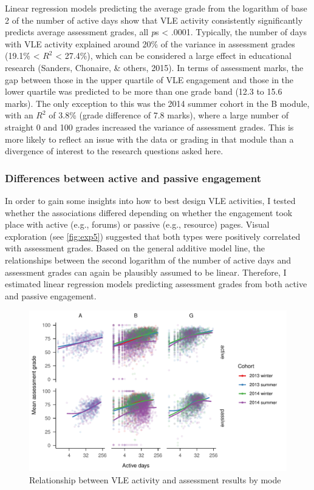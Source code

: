 \documentclass[
  english,
  man,mask,floatsintext]{apa6}
\begin{document}
Linear regression models predicting the average grade from the logarithm of base 2 of the number of active days show that VLE activity consistently significantly predicts average assessment grades, all \emph{p}s \textless{} .0001. Typically, the number of days with VLE activity explained around 20\% of the variance in assessment grades (19.1\% \textless{} \(R^2\) \textless{} 27.4\%), which can be considered a large effect in educational research (Sanders, Chonaire, \& others, 2015). In terms of assessment marks, the gap between those in the upper quartile of VLE engagement and those in the lower quartile was predicted to be more than one grade band (12.3 to 15.6 marks). The only exception to this was the 2014 summer cohort in the B module, with an \(R^2\) of 3.8\% (grade difference of 7.8 marks), where a large number of straight 0 and 100 grades increased the variance of assessment grades. This is more likely to reflect an issue with the data or grading in that module than a divergence of interest to the research questions asked here.

\hypertarget{differences-between-active-and-passive-engagement}{%
\subsubsection{Differences between active and passive engagement}\label{differences-between-active-and-passive-engagement}}

In order to gain some insights into how to best design VLE activities, I tested whether the associations differed depending on whether the engagement took place with active (e.g., forums) or passive (e.g., resource) pages. Visual exploration (see \autoref{fig:exp5}) suggested that both types were positively correlated with assessment grades. Based on the general additive model line, the relationships between the second logarithm of the number of active days and assessment grades can again be plausibly assumed to be linear. Therefore, I estimated linear regression models predicting assessment grades from both active and passive engagement.

\begin{figure}
\centering
\includegraphics{Assigment-2---OU-data_files/figure-latex/unnamed-chunk-6-1.pdf}
\caption{\label{fig:unnamed-chunk-6}Relationship between VLE activity and assessment results by mode \label{fig:exp5}}
\end{figure}
\end{document}
